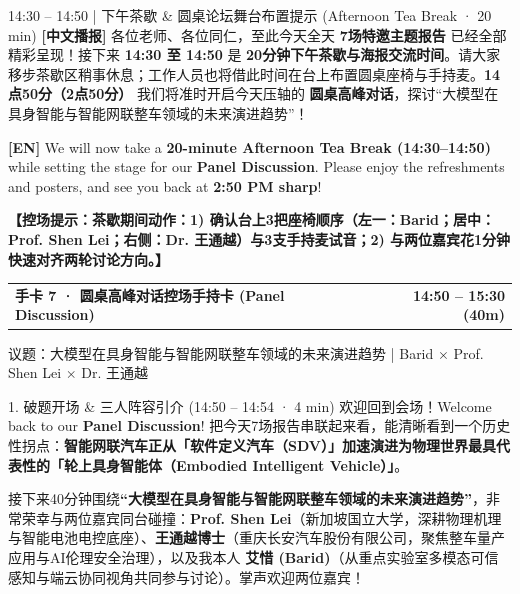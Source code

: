 \documentclass[12pt,a4paper]{article}
\makeatletter
\newcommand{\cardbanner}[3]{%
  \begin{tcolorbox}[
    enhanced, colback=nusnavy, colframe=nusnavy, arc=1.8mm,
    boxrule=0pt, left=3.8mm, right=3.8mm, top=2.1mm, bottom=2.2mm,
    before skip=0pt, after skip=2.4mm,
    borderline south={1.1mm}{0mm}{nusorange}
  ]
    \begin{tabularx}{\linewidth}{@{}X r@{}}
      {\fontsize{13.2}{16}\selectfont\color{white}\textbf{#1}} &
      {\fontsize{11.2}{14}\selectfont\color{orangebg}\textbf{#2}}
    \end{tabularx}
    \vspace{0.6mm}
    {\fontsize{9.3}{11.8}\selectfont\color{slate200}#3}
  \end{tcolorbox}
}
\newcommand{\cue}[1]{%
  {\fontsize{9.6}{12.5}\selectfont\textcolor{nusorange}{\textbf{【控场提示：#1】}}}%
}
\makeatother
\begin{document}
\begin{transbox}{14:30 – 14:50 \;|\; 下午茶歇 \& 圆桌论坛舞台布置提示 (Afternoon Tea Break · 20 min)}
\fontsize{11.4}{16.6}\selectfont
\textbf{[中文播报]} 各位老师、各位同仁，至此今天全天 \textbf{7场特邀主题报告} 已经全部精彩呈现！接下来 \textbf{14:30 至 14:50} 是 \textbf{20分钟下午茶歇与海报交流时间}。请大家移步茶歇区稍事休息；工作人员也将借此时间在台上布置圆桌座椅与手持麦。\textbf{14点50分（2点50分）} 我们将准时开启今天压轴的 \textbf{圆桌高峰对话}，探讨“大模型在具身智能与智能网联整车领域的未来演进趋势”！\par
\vspace{1mm}
\textbf{[EN]} We will now take a \textbf{20-minute Afternoon Tea Break (14:30–14:50)} while setting the stage for our \textbf{Panel Discussion}. Please enjoy the refreshments and posters, and see you back at \textbf{2:50 PM sharp}!\par
\vspace{1mm}
\cue{茶歇期间动作：1) 确认台上3把座椅顺序（左一：Barid；居中：Prof. Shen Lei；右侧：Dr. 王通越）与3支手持麦试音；2) 与两位嘉宾花1分钟快速对齐两轮讨论方向。}
\end{transbox}

\newpage

\cardbanner{手卡 7 · 圆桌高峰对话控场手持卡 (Panel Discussion)}{14:50 – 15:30 (40m)}{议题：大模型在具身智能与智能网联整车领域的未来演进趋势 \;|\; Barid $\times$ Prof. Shen Lei $\times$ Dr. 王通越}

\begin{scriptbox}{1. 破题开场 \& 三人阵容引介 (14:50 – 14:54 · 4 min)}
\fontsize{10.8}{15.4}\selectfont
欢迎回到会场！Welcome back to our \textbf{Panel Discussion}! 把今天7场报告串联起来看，能清晰看到一个历史性拐点：\textbf{智能网联汽车正从「软件定义汽车（SDV）」加速演进为物理世界最具代表性的「轮上具身智能体（Embodied Intelligent Vehicle）」}。\par
接下来40分钟围绕\textbf{“大模型在具身智能与智能网联整车领域的未来演进趋势”}，非常荣幸与两位嘉宾同台碰撞：\textbf{Prof. Shen Lei}（新加坡国立大学，深耕物理机理与智能电池电控底座）、\textbf{王通越博士}（重庆长安汽车股份有限公司，聚焦整车量产应用与AI伦理安全治理），以及我本人 \textbf{艾惜 (Barid)}（从重点实验室多模态可信感知与端云协同视角共同参与讨论）。掌声欢迎两位嘉宾！
\end{scriptbox}
\end{document}
